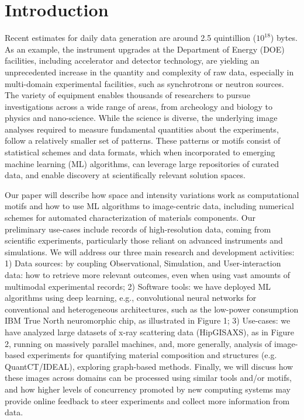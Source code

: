 \documentclass[conference]{IEEEtran}
\begin{document}




\section{Introduction}
Recent estimates for daily data generation are around 2.5 quintillion ($10^{18}$) bytes. As an example, the instrument upgrades at the Department of Energy (DOE) facilities, including accelerator and detector technology, are yielding an unprecedented increase in the quantity and complexity of raw data, especially in multi-domain experimental facilities, such as synchrotrons or neutron sources. The variety of equipment enables thousands of researchers to pursue investigations across a wide range of areas, from archeology and biology to physics and nano-science. While the science is diverse, the underlying image analyses required to measure fundamental quantities about the experiments, follow a
relatively smaller set of patterns. These patterns or motifs consist of statistical schemes and data formats, which when incorporated to emerging machine learning (ML) algorithms, can leverage large repositories of curated data, and enable discovery at scientifically relevant solution spaces.

Our paper will describe how space and intensity variations work as computational motifs and how to use ML algorithms to image-centric data, including numerical schemes for automated characterization of materials components. Our preliminary use-cases include records of high-resolution data, coming from scientific experiments, particularly those reliant on advanced instruments and simulations. We will address our three main research and development activities:
1) Data sources: by coupling Observational, Simulation, and User-interaction data: how to retrieve
more relevant outcomes, even when using vast amounts of multimodal experimental records;
2) Software tools: we have deployed ML algorithms using deep learning, e.g., convolutional neural
networks for conventional and heterogeneous architectures, such as the low-power consumption IBM True
North neuromorphic chip, as illustrated in Figure 1;
3) Use-cases: we have analyzed large datasets of x-ray scattering data (HipGISAXS), as in Figure 2,
running on massively parallel machines, and, more generally, analysis of image-based experiments for
quantifying material composition and structures (e.g. QuantCT/IDEAL), exploring graph-based methods.
Finally, we will discuss how these images across domains can be processed using similar tools and/or
motifs, and how higher levels of concurrency promoted by new computing systems may provide online
feedback to steer experiments and collect more information from data.
\end{document}
